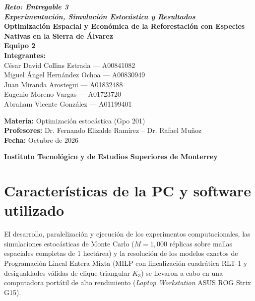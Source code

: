 \documentclass[11pt,a4paper]{article}
\begin{document}
\thispagestyle{empty}
\begin{center}
    \vspace*{1.2cm}
    {\Huge\bfseries\itshape Reto: Entregable 3}\\[0.4cm]
    {\huge\bfseries\itshape Experimentación, Simulación Estocástica y Resultados}\\[0.6cm]
    {\Large\bfseries Optimización Espacial y Económica de la Reforestación con Especies Nativas en la Sierra de Álvarez}\\[1.5cm]

    {\Large\bfseries Equipo 2}\\[0.6cm]

    {\Large\bfseries Integrantes:}\\[0.3cm]
    {\large
    César David Collins Estrada — A00841082\\[0.15cm]
    Miguel Ángel Hernández Ochoa — A00830949\\[0.15cm]
    Juan Miranda Arostegui — A01832488\\[0.15cm]
    Eugenio Moreno Vargas — A01723720\\[0.15cm]
    Abraham Vicente González — A01199401\\[1.4cm]
    }

    {\large
    \textbf{Materia:} Optimización estocástica (Gpo 201)\\[0.25cm]
    \textbf{Profesores:} Dr. Fernando Elizalde Ramírez – Dr. Rafael Muñoz\\[0.25cm]
    \textbf{Fecha:} Octubre de 2026\\[2.0cm]
    }

    {\Large\bfseries Instituto Tecnológico y de Estudios Superiores de Monterrey}
\end{center}

\newpage
\thispagestyle{empty}
\tableofcontents
\newpage

\setcounter{page}{1}

\section{Características de la PC y software utilizado}

El desarrollo, paralelización y ejecución de los experimentos computacionales, las simulaciones estocásticas de Monte Carlo ($M = 1,000$ réplicas sobre mallas espaciales completas de 1 hectárea) y la resolución de los modelos exactos de Programación Lineal Entera Mixta (MILP con linealización cuadrática RLT-1 y desigualdades válidas de clique triangular $K_3$) se llevaron a cabo en una computadora portátil de alto rendimiento (\textit{Laptop Workstation} ASUS ROG Strix G15). 
\end{document}
